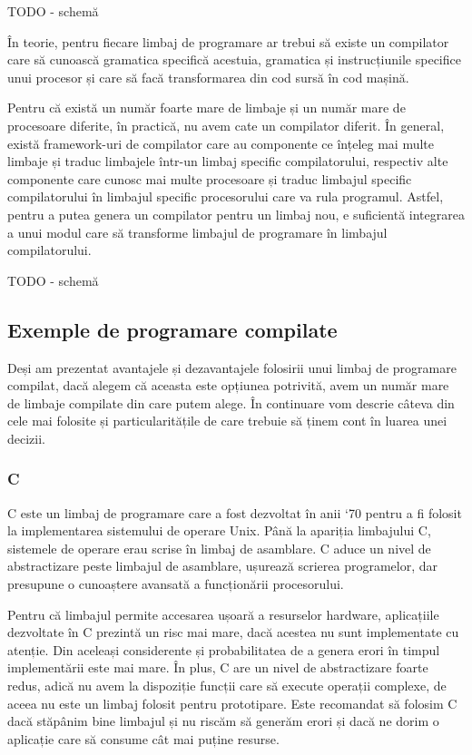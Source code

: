 TODO - schemă

În teorie, pentru fiecare limbaj de programare ar trebui să existe un compilator
care să cunoască gramatica specifică acestuia, gramatica și instrucțiunile
specifice unui procesor și care să facă transformarea din cod sursă în cod
mașină.

Pentru că există un număr foarte mare de limbaje și un număr mare de procesoare
diferite, în practică, nu avem cate un compilator diferit. În general, există
framework-uri de compilator care au componente ce înțeleg mai multe limbaje și
traduc limbajele într-un limbaj specific compilatorului, respectiv alte
componente care cunosc mai multe procesoare și traduc limbajul specific
compilatorului în limbajul specific procesorului care va rula programul. Astfel,
pentru a putea genera un compilator pentru un limbaj nou, e suficientă
integrarea a unui modul care să transforme limbajul de programare în limbajul
compilatorului.

TODO - schemă

\subsection{Exemple de programare compilate}
\label{sec:appdev-langs-comp-ex}

Deși am prezentat avantajele și dezavantajele folosirii unui limbaj de
programare compilat, dacă alegem că aceasta este opțiunea potrivită, avem un
număr mare de limbaje compilate din care putem alege. În continuare vom descrie
câteva din cele mai folosite și particularitățile de care trebuie să ținem cont
în luarea unei decizii.

\subsubsection{C}
\label{sec:appdev-langs-comp-ex-c}

C este un limbaj de programare care a fost dezvoltat în anii ‘70 pentru a fi
folosit la implementarea sistemului de operare Unix. Până la apariția limbajului
C, sistemele de operare erau scrise în limbaj de asamblare. C aduce un nivel de
abstractizare peste limbajul de asamblare, ușurează scrierea programelor, dar
presupune o cunoaștere avansată a funcționării procesorului.

Pentru că limbajul permite accesarea ușoară a resurselor hardware, aplicațiile
dezvoltate în C prezintă un risc mai mare, dacă acestea nu sunt implementate cu
atenție. Din aceleași considerente și probabilitatea de a genera erori în timpul
implementării este mai mare. În plus, C are un nivel de abstractizare foarte
redus, adică nu avem la dispoziție funcții care să execute operații complexe, de
aceea nu este un limbaj folosit pentru prototipare. Este recomandat să folosim C
dacă stăpânim bine limbajul și nu riscăm să generăm erori și dacă ne dorim o
aplicație care să consume cât mai puține resurse.

